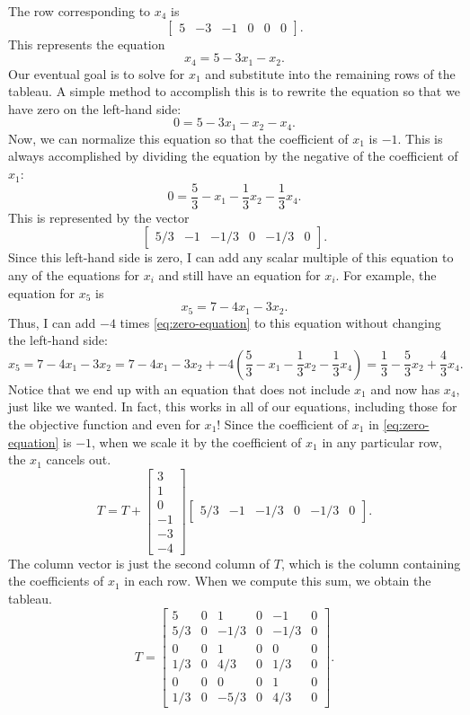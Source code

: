 The row corresponding to $x_4$ is
\[
\begin{bmatrix} 5 &-3 &-1 & 0 & 0 & 0\end{bmatrix}.
\]
This represents the equation
\[
x_4 = 5 - 3x_1 - x_2.
\]
Our eventual goal is to solve for $x_1$ and substitute into the remaining rows of the tableau.
A simple method to accomplish this is to rewrite the equation so that we have zero on the left-hand side:
\[
0 = 5 - 3x_1 - x_2 - x_4.
\]
Now, we can normalize this equation so that the coefficient of $x_1$ is $-1$.
This is always accomplished by dividing the equation by the negative of the coefficient of $x_1$:
\begin{equation}
0 = \frac{5}{3} - x_1 - \frac{1}{3}x_2 - \frac{1}{3}x_4.
\label{eq:zero-equation}
\end{equation}
This is represented by the vector
\[
\begin{bmatrix} 5/3 & -1 & -1/3 & 0 & -1/3 & 0\end{bmatrix}.
\]
Since this left-hand side is zero, I can add any scalar multiple of this equation to any of the equations for $x_i$ and still have an equation for $x_i$.
For example, the equation for $x_5$ is
\[
x_5 = 7 - 4x_1 - 3x_2.
\]
Thus, I can add $-4$ times \eqref{eq:zero-equation} to this equation without changing the left-hand side:
\[ x_5 = 7 - 4x_1 - 3x_2 = 7 - 4x_1 - 3x_2 + -4\left(\frac{5}{3} - x_1 - \frac{1}{3}x_2 - \frac{1}{3}x_4\right) = \frac{1}{3} - \frac{5}{3}x_2 + \frac{4}{3} x_4.
\]
Notice that we end up with an equation that does not include $x_1$ and now has $x_4$, just like we wanted.
In fact, this works in all of our equations, including those for the objective function and even for $x_1$!
Since the coefficient of $x_1$ in \eqref{eq:zero-equation} is $-1$, when we scale it by the coefficient of $x_1$ in any particular row, the $x_1$ cancels out.
\[
T = T + \begin{bmatrix}3 \\ 1 \\ 0 \\ -1 \\ -3 \\ -4\end{bmatrix}\begin{bmatrix} 5/3 & -1 & -1/3 & 0 & -1/3 & 0\end{bmatrix}.
\]
The column vector is just the second column of $T$, which is the column containing the coefficients of $x_1$ in each row.
When we compute this sum, we obtain the tableau.
\[
T = \begin{bmatrix}
        5 &  0 & 1 & 0 & -1 & 0 \\
        5/3 & 0 &-1/3 & 0 &-1/3 & 0 \\
        0 & 0 & 1 & 0 & 0 & 0 \\
        1/3 & 0 & 4/3 & 0 & 1/3 & 0 \\
        0 & 0 & 0 & 0 & 1 & 0 \\
        1/3 & 0 & -5/3 & 0 & 4/3 & 0
\end{bmatrix}.
\]
